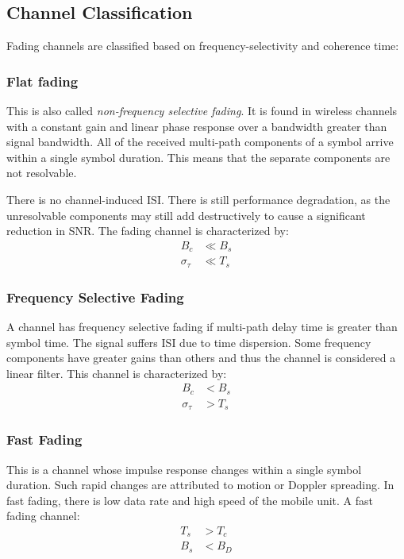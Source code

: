 \subsection{Channel Classification}
Fading channels are classified based on frequency-selectivity and coherence time:
\subsubsection{Flat fading}
This is also called \emph{non-frequency selective fading}. It is found in wireless channels with a constant gain and linear phase response over a bandwidth greater than signal bandwidth\cite{fuqin}. All of the received multi-path components of a symbol arrive within a single symbol duration. This means that the separate components are not resolvable.

There is no channel-induced \gls{ISI}. There is still performance degradation, as the unresolvable components may still add destructively to cause a significant reduction in \gls{SNR}. The fading channel is characterized by:
\begin{align*}
	B_c &\ll B_s \\
	\sigma_\tau &\ll T_s
\end{align*}
\begin{mathDef}
\end{mathDef}
\subsubsection{Frequency Selective Fading}
A channel has frequency selective fading if multi-path delay time is greater than symbol time. The signal suffers \gls{ISI} due to time dispersion. Some frequency components have greater gains than others and thus the channel is considered a linear filter\cite{fuqin}. This channel is characterized by:
\begin{align*}
	B_c &< B_s \\
	\sigma_\tau &> T_s
\end{align*}
\subsubsection{Fast Fading}
This is a channel whose impulse response changes within a single symbol duration. Such rapid changes are attributed to motion or Doppler spreading. In fast fading, there is low data rate and high speed of the mobile unit\cite{fuqin}. A fast fading channel:
\begin{align*}
	T_s &> T_c \\
	B_s &< B_D
\end{align*}
